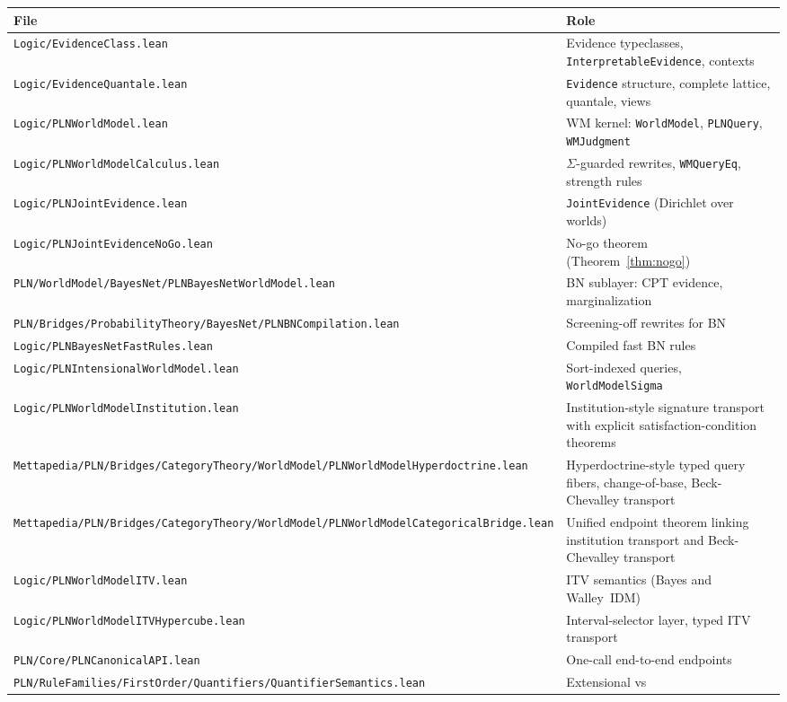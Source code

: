 \documentclass[]{article}
\newcommand{\code}[1]{\texttt{#1}}
\begin{document}
\begin{longtable}{p{}p{}}
\hline
\textbf{File} & \textbf{Role} \\ \hline
\endhead
\code{Logic/EvidenceClass.lean} & Evidence typeclasses,
  \code{InterpretableEvidence}, contexts \\
\code{Logic/EvidenceQuantale.lean} & \code{Evidence} structure, complete
  lattice, quantale, views \\
\code{Logic/PLNWorldModel.lean} & WM kernel: \code{WorldModel},
  \code{PLNQuery}, \code{WMJudgment} \\
\code{Logic/PLNWorldModelCalculus.lean} & $\Sigma$-guarded rewrites,
  \code{WMQueryEq}, strength rules \\
\code{Logic/PLNJointEvidence.lean} & \code{JointEvidence} (Dirichlet over
  worlds) \\
\code{Logic/PLNJointEvidenceNoGo.lean} & No-go theorem
  (Theorem~\ref{thm:nogo}) \\
\code{PLN/WorldModel/BayesNet/PLNBayesNetWorldModel.lean} & BN sublayer: CPT evidence,
  marginalization \\
\code{PLN/Bridges/ProbabilityTheory/BayesNet/PLNBNCompilation.lean} & Screening-off rewrites for BN \\
\code{Logic/PLNBayesNetFastRules.lean} & Compiled fast BN rules \\
\code{Logic/PLNIntensionalWorldModel.lean} & Sort-indexed queries,
  \code{WorldModelSigma} \\
\code{Logic/PLNWorldModelInstitution.lean} & Institution-style signature
  transport with explicit satisfaction-condition theorems \\
\code{Mettapedia/PLN/Bridges/CategoryTheory/WorldModel/PLNWorldModelHyperdoctrine.lean} & Hyperdoctrine-style typed
  query fibers, change-of-base, Beck-Chevalley transport \\
\code{Mettapedia/PLN/Bridges/CategoryTheory/WorldModel/PLNWorldModelCategoricalBridge.lean} & Unified endpoint
  theorem linking institution transport and Beck-Chevalley transport \\
\code{Logic/PLNWorldModelITV.lean} & ITV semantics (Bayes and
  Walley~IDM) \\
\code{Logic/PLNWorldModelITVHypercube.lean} & Interval-selector layer,
  typed ITV transport \\
\code{PLN/Core/PLNCanonicalAPI.lean} & One-call end-to-end endpoints \\
\code{PLN/RuleFamilies/FirstOrder/Quantifiers/QuantifierSemantics.lean} & Extensional vs

\end{longtable}
\end{document}
